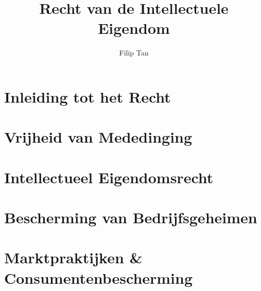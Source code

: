 \documentclass{article}
\title{Recht van de Intellectuele Eigendom}
\author{Filip Tan}
\date{}
\numberwithin{figure}{section}
\begin{document}
\part{Inleiding tot het Recht}


\part{Vrijheid van Mededinging}


\part{Intellectueel Eigendomsrecht}


\part{Bescherming van Bedrijfsgeheimen}
 \part{Marktpraktijken \& Consumentenbescherming}
\end{document}
